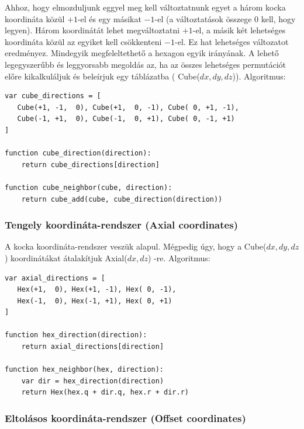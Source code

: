 \noindent Ahhoz, hogy elmozduljunk eggyel meg kell változtatnunk egyet a három kocka koordináta közül $+1$-el és egy másikat $-1$-el (a változtatások összege $0$ kell, hogy legyen). Három koordinátát lehet megváltoztatni $+1$-el, a másik két lehetséges koordináta közül az egyiket kell csökkenteni $-1$-el. Ez hat lehetséges változatot eredményez. Mindegyik megfeleltethető a hexagon egyik irányának. A lehető legegyszerűbb és leggyorsabb megoldás az, ha az összes lehetséges permutációt előre kikalkuláljuk és beleírjuk egy táblázatba ( Cube($dx, dy, dz$)).
\newline
\newline Algoritmus: 
\begin{verbatim}
var cube_directions = [
   Cube(+1, -1,  0), Cube(+1,  0, -1), Cube( 0, +1, -1),
   Cube(-1, +1,  0), Cube(-1,  0, +1), Cube( 0, -1, +1)
]

function cube_direction(direction):
    return cube_directions[direction]

function cube_neighbor(cube, direction):
    return cube_add(cube, cube_direction(direction))
\end{verbatim}

\subsubsection{Tengely koordináta-rendszer (Axial coordinates)}

\noindent A kocka koordináta-rendszer veszük alapul. Mégpedig úgy, hogy a Cube($ dx, dy, dz$) koordinátákat átalakítjuk Axial($ dx, dz$) -re.
\newline
\newline Algoritmus:
\begin{verbatim}
var axial_directions = [
   Hex(+1,  0), Hex(+1, -1), Hex( 0, -1),
   Hex(-1,  0), Hex(-1, +1), Hex( 0, +1)
]

function hex_direction(direction):
    return axial_directions[direction]

function hex_neighbor(hex, direction):
    var dir = hex_direction(direction)
    return Hex(hex.q + dir.q, hex.r + dir.r)
\end{verbatim}

\subsubsection{Eltolásos koordináta-rendszer (Offset coordinates)}

